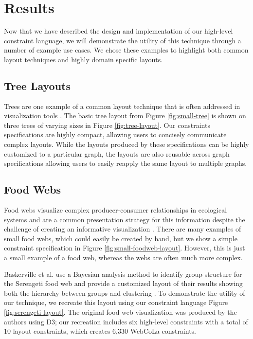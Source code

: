 \section{Results}
Now that we have described the design and implementation of our high-level constraint language, we will demonstrate the utility of this technique through a number of example use cases. We chose these examples to highlight both common layout techniques and highly domain specific layouts.

\subsection{Tree Layouts}
\treeLayout
\serengetiLayout
Trees are one example of a common layout technique that is often addressed in visualization tools \cite{bostock:d3,WebCoLa,ellson2001graphviz}. The basic tree layout from Figure \ref{fig:small-tree} is shown on three trees of varying sizes in Figure \ref{fig:tree-layout}. Our constraints specifications are highly compact, allowing users to concisely communicate complex layouts. While the layouts produced by these specifications can be highly customized to a particular graph, the layouts are also reusable across graph specifications allowing users to easily reapply the same layout to multiple graphs.

\subsection{Food Webs}
\smallFoodWebLayout
Food webs visualize complex producer-consumer relationships in ecological systems and are a common presentation strategy for this information despite the challenge of creating an informative visualization \cite{baskerville2011spatial,lavigne1996cod}. There are many examples of small food webs, which could easily be created by hand, but we show a simple constraint specification in Figure \ref{fig:small-foodweb-layout}. However, this is just a small example of a food web, whereas the webs are often much more complex.

Baskerville et al. use a Bayesian analysis method to identify group structure for the Serengeti food web and provide a customized layout of their results showing both the hierarchy between groups and clustering \cite{baskerville2011spatial}. To demonstrate the utility of our technique, we recreate this layout using our constraint language Figure \ref{fig:serengeti-layout}. The original food web visualization was produced by the authors using D3; our recreation includes six high-level constraints with a total of 10 layout constraints, which creates 6,330 WebCoLa constraints.

